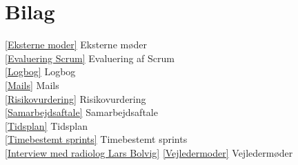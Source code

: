 \chapter{Bilag}\label{kapBilag}

\ref{Eksterne moder} Eksterne møder \\
\ref{Evaluering Scrum} Evaluering af Scrum\\
\ref{Logbog} Logbog\\
\ref{Mails} Mails \\
\ref{Risikovurdering} Risikovurdering \\
\ref{Samarbejdsaftale} Samarbejdsaftale \\
\ref{Tidsplan} Tidsplan \\
\ref{Timebestemt sprints} Timebestemt sprints \\
\ref{Interview med radiolog Lars Bolvig}
\ref{Vejledermoder} Vejledermøder

